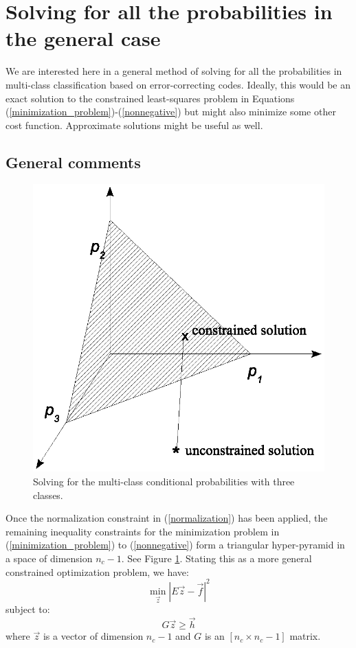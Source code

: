 \section{Solving for all the probabilities in the general case}

\label{general_case_solution}

We are interested here in a general method of solving for all the probabilities
in multi-class classification based on error-correcting codes.
Ideally, this would be an exact solution to the constrained least-squares problem
in Equations (\ref{minimization_problem})-(\ref{nonnegative}) but might also
minimize some other cost function.
Approximate solutions might be useful as well.

\subsection{General comments}

\begin{figure}
	\includegraphics[width=1\textwidth]{../multi2/config1.eps}
	\caption{Solving for the multi-class conditional probabilities with three classes.}
	\label{config1}
\end{figure}

Once the normalization constraint in (\ref{normalization}) has been applied,
the remaining inequality constraints for the minimization problem in
(\ref{minimization_problem}) to (\ref{nonnegative}) form a triangular
hyper-pyramid in a space of dimension $n_c-1$.
See Figure \ref{config1}.
Stating this as a more general constrained optimization problem, we have:
\begin{equation}
	\min_{\vec z} | E \vec z - \vec f |^2
	\label{minimization2}
\end{equation}
subject to:
\begin{equation}
	G \vec z \ge \vec h
	\label{inequality2}
\end{equation}
where $\vec z$ is a vector of dimension $n_c-1$ 
and $G$ is an $[n_c \times n_c-1]$ matrix.

